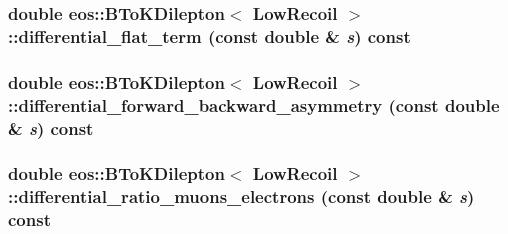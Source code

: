 \label{classeos_1_1BToKDilepton_3_01LowRecoil_01_4_a610b93d6e65a048705a5debd9d9fd912}
\hypertarget{classeos_1_1BToKDilepton_3_01LowRecoil_01_4_a67f0c64f85102dc8ed5052eaa99573e1}{
\subsubsection[{differential\_\-flat\_\-term}]{\setlength{\rightskip}{0pt plus 5cm}double eos::BToKDilepton$<$ {\bf LowRecoil} $>$::differential\_\-flat\_\-term (const double \& {\em s}) const}}
\label{classeos_1_1BToKDilepton_3_01LowRecoil_01_4_a67f0c64f85102dc8ed5052eaa99573e1}
\hypertarget{classeos_1_1BToKDilepton_3_01LowRecoil_01_4_a497df1a985ca9a80018557711f7b2ad3}{
\subsubsection[{differential\_\-forward\_\-backward\_\-asymmetry}]{\setlength{\rightskip}{0pt plus 5cm}double eos::BToKDilepton$<$ {\bf LowRecoil} $>$::differential\_\-forward\_\-backward\_\-asymmetry (const double \& {\em s}) const}}
\label{classeos_1_1BToKDilepton_3_01LowRecoil_01_4_a497df1a985ca9a80018557711f7b2ad3}
\hypertarget{classeos_1_1BToKDilepton_3_01LowRecoil_01_4_aecc334af199b1b9c16db9018e4a61b85}{
\subsubsection[{differential\_\-ratio\_\-muons\_\-electrons}]{\setlength{\rightskip}{0pt plus 5cm}double eos::BToKDilepton$<$ {\bf LowRecoil} $>$::differential\_\-ratio\_\-muons\_\-electrons (const double \& {\em s}) const}}
